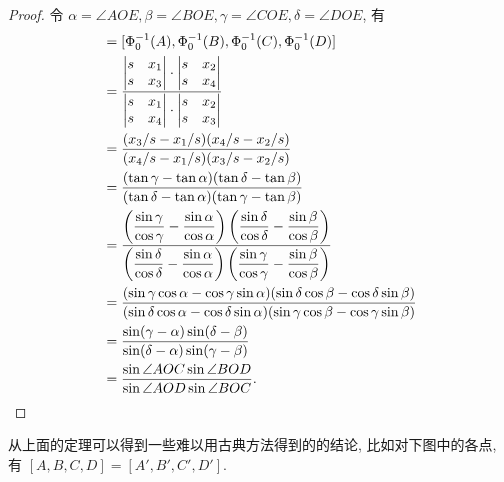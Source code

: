 \documentclass{ctexart}
\begin{document}
\begin{proof}
    令 $\alpha=\angle AOE,\beta=\angle BOE,\gamma=\angle COE,\delta=\angle DOE$, 有
    \begin{align*}
        [A,B,C,D] & =[\Phi_0^{-1}(A),\Phi_0^{-1}(B),\Phi_0^{-1}(C),\Phi_0^{-1}(D)] \\
        & =\dfrac{\begin{vmatrix}
            s & x_1 \\
            s & x_3 \\
        \end{vmatrix}\cdot\begin{vmatrix}
            s & x_2 \\
            s & x_4 \\
        \end{vmatrix}}{\begin{vmatrix}
            s & x_1 \\
            s & x_4 \\
        \end{vmatrix}\cdot\begin{vmatrix}
            s & x_2 \\
            s & x_3 \\
        \end{vmatrix}} \\
        & =\dfrac{(x_3/s-x_1/s)(x_4/s-x_2/s)}{(x_4/s-x_1/s)(x_3/s-x_2/s)} \\
        & =\dfrac{(\tan\gamma-\tan\alpha)(\tan\delta-\tan\beta)}{(\tan\delta-\tan\alpha)(\tan\gamma-\tan\beta)} \\
        & =\dfrac{\left(\dfrac{\sin\gamma}{\cos\gamma}-\dfrac{\sin\alpha}{\cos\alpha}\right)\left(\dfrac{\sin\delta}{\cos\delta}-\dfrac{\sin\beta}{\cos\beta}\right)}{\left(\dfrac{\sin\delta}{\cos\delta}-\dfrac{\sin\alpha}{\cos\alpha}\right)\left(\dfrac{\sin\gamma}{\cos\gamma}-\dfrac{\sin\beta}{\cos\beta}\right)} \\
        & =\dfrac{(\sin\gamma\cos\alpha-\cos\gamma\sin\alpha)(\sin\delta\cos\beta-\cos\delta\sin\beta)}{(\sin\delta\cos\alpha-\cos\delta\sin\alpha)(\sin\gamma\cos\beta-\cos\gamma\sin\beta)} \\
        & =\dfrac{\sin(\gamma-\alpha)\sin(\delta-\beta)}{\sin(\delta-\alpha)\sin(\gamma-\beta)} \\
        & =\dfrac{\sin\angle AOC\sin\angle BOD}{\sin\angle AOD\sin\angle BOC}.\qedhere
    \end{align*}
\end{proof}
从上面的定理可以得到一些难以用古典方法得到的的结论, 比如对下图中的各点, 有 $[A,B,C,D]=[A',B',C',D']$.
\end{document}
